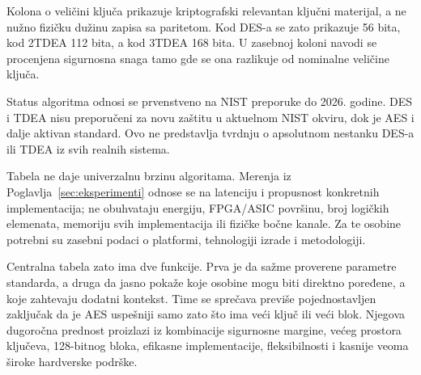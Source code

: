 Kolona o veličini ključa prikazuje kriptografski relevantan ključni
materijal, a ne nužno fizičku dužinu zapisa sa paritetom. Kod DES-a se
zato prikazuje 56 bita, kod 2TDEA 112 bita, a kod 3TDEA 168 bita.
U zasebnoj koloni navodi se procenjena sigurnosna snaga tamo gde se
ona razlikuje od nominalne veličine ključa.

Status algoritma odnosi se prvenstveno na NIST preporuke do 2026.
godine. DES i TDEA nisu preporučeni za novu zaštitu u aktuelnom
NIST okviru, dok je AES i dalje aktivan standard. Ovo ne predstavlja
tvrdnju o apsolutnom nestanku DES-a ili TDEA iz svih realnih sistema.

Tabela ne daje univerzalnu brzinu algoritama. Merenja iz
Poglavlja~\ref{sec:eksperimenti} odnose se na latenciju i propusnost
konkretnih implementacija; ne obuhvataju energiju, FPGA/ASIC površinu,
broj logičkih elemenata, memoriju svih implementacija ili fizičke bočne
kanale. Za te osobine potrebni su zasebni podaci o platformi,
tehnologiji izrade i metodologiji.

Centralna tabela zato ima dve funkcije. Prva je da sažme proverene
parametre standarda, a druga da jasno pokaže koje osobine mogu biti
direktno poređene, a koje zahtevaju dodatni kontekst. Time se sprečava
previše pojednostavljen zaključak da je AES uspešniji samo zato što ima
veći ključ ili veći blok. Njegova dugoročna prednost proizlazi iz
kombinacije sigurnosne margine, većeg prostora ključeva, 128-bitnog
bloka, efikasne implementacije, fleksibilnosti i kasnije veoma široke
hardverske podrške.


